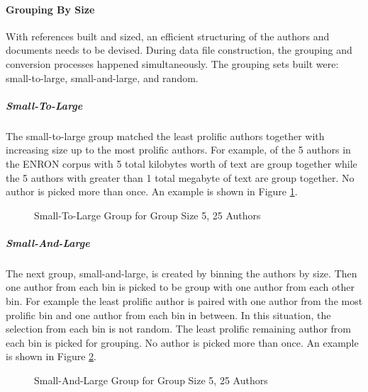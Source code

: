 	\paragraph{Grouping By Size} With references built and sized, an efficient structuring of the authors and documents needs to be devised.  During data file construction, the grouping and conversion processes happened simultaneously.  The grouping sets built were: small-to-large, small-and-large, and random.  
		\subparagraph{Small-To-Large} The small-to-large group matched the least prolific authors together with increasing size up to the most prolific authors.  For example, of the 5 authors in the ENRON corpus with 5 total kilobytes worth of text are group together while the 5 authors with greater than 1 total megabyte of text are group together.  No author is picked more than once.  An example is shown in Figure \ref{fig:smallToLargeGrouping}.
		\begin{figure}[ht!]
			\begin{center}
				\caption{Small-To-Large Group for Group Size 5, 25 Authors}
				\label{fig:smallToLargeGrouping}
			\end{center}
		\end{figure}
		\subparagraph{Small-And-Large} The next group, small-and-large, is created by binning the authors by size.  Then one author from each bin is picked to be group with one author from each other bin.  For example the least prolific author is paired with one author from the most prolific bin and one author from each bin in between.  In this situation, the selection from each bin is not random.  The least prolific remaining author from each bin is picked for grouping.  No author is picked more than once. An example is shown in Figure \ref{fig:smallAndLargeGrouping}.
		\begin{figure}[ht!]
			\begin{center}
				\caption{Small-And-Large Group for Group Size 5, 25 Authors}
				\label{fig:smallAndLargeGrouping}
			\end{center}
		\end{figure}
